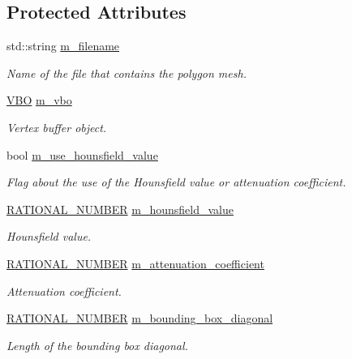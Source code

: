 \subsection*{Protected Attributes}
\begin{DoxyCompactItemize}
\item 
std::string \hyperlink{class_graphics_1_1_polygon_mesh_a455483e27861ed72beacd76e70c438bb}{m\_\-filename}
\begin{DoxyCompactList}\small\item\em Name of the file that contains the polygon mesh. \end{DoxyCompactList}\item 
\hyperlink{class_graphics_1_1_v_b_o}{VBO} \hyperlink{class_graphics_1_1_polygon_mesh_a181beb08c7c8b9a42666b948ed48f6da}{m\_\-vbo}
\begin{DoxyCompactList}\small\item\em Vertex buffer object. \end{DoxyCompactList}\item 
bool \hyperlink{class_graphics_1_1_polygon_mesh_a5c193c50619f85408f295c8c0a5e43a6}{m\_\-use\_\-hounsfield\_\-value}
\begin{DoxyCompactList}\small\item\em Flag about the use of the Hounsfield value or attenuation coefficient. \end{DoxyCompactList}\item 
\hyperlink{namespace_utilities_a40969b96bd8d847b962e297cb79f08ce}{RATIONAL\_\-NUMBER} \hyperlink{class_graphics_1_1_polygon_mesh_a2c2e3ac536ecf140a464fe074b4a6cb0}{m\_\-hounsfield\_\-value}
\begin{DoxyCompactList}\small\item\em Hounsfield value. \end{DoxyCompactList}\item 
\hyperlink{namespace_utilities_a40969b96bd8d847b962e297cb79f08ce}{RATIONAL\_\-NUMBER} \hyperlink{class_graphics_1_1_polygon_mesh_ab1ca7c29c40e562b58ff4915e26724cb}{m\_\-attenuation\_\-coefficient}
\begin{DoxyCompactList}\small\item\em Attenuation coefficient. \end{DoxyCompactList}\item 
\hyperlink{namespace_utilities_a40969b96bd8d847b962e297cb79f08ce}{RATIONAL\_\-NUMBER} \hyperlink{class_graphics_1_1_polygon_mesh_aaa93546b5f9f1f9ddb70aaeeb2ed5be8}{m\_\-bounding\_\-box\_\-diagonal}
\begin{DoxyCompactList}\small\item\em Length of the bounding box diagonal. \end{DoxyCompactList}\item 

\end{DoxyCompactItemize}
